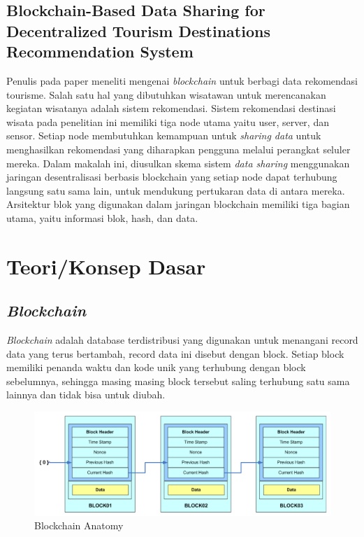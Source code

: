 \subsection{Blockchain-Based Data Sharing for Decentralized Tourism Destinations Recommendation System}
Penulis pada paper \parencite{hariadi2020} meneliti mengenai \emph{blockchain} untuk berbagi data rekomendasi tourisme.
Salah satu hal yang dibutuhkan wisatawan untuk merencanakan kegiatan wisatanya adalah sistem rekomendasi.
Sistem rekomendasi destinasi wisata pada penelitian ini memiliki tiga node utama yaitu user, server, dan sensor.
Setiap node membutuhkan kemampuan untuk \emph{sharing data} untuk menghasilkan rekomendasi yang diharapkan pengguna melalui perangkat seluler mereka.
Dalam makalah ini, diusulkan skema sistem \emph{data sharing} menggunakan jaringan desentralisasi berbasis blockchain yang setiap node dapat terhubung langsung satu sama lain, untuk mendukung pertukaran data di antara mereka. Arsitektur blok yang digunakan dalam jaringan blockchain memiliki tiga bagian utama, yaitu informasi blok, hash, dan data.

\section{Teori/Konsep Dasar}

\subsection{\emph{Blockchain}}

\emph{Blockchain} adalah database terdistribusi yang digunakan
untuk menangani record data yang terus bertambah, record data ini
disebut dengan block. Setiap block memiliki penanda waktu dan
kode unik yang terhubung dengan block sebelumnya, sehingga masing
masing block tersebut saling terhubung satu sama lainnya dan
tidak bisa untuk diubah.

\begin{figure} [ht] \centering
    \includegraphics[scale=0.4]{gambar/blockchainanatomy.png}
    \caption{Blockchain Anatomy}
    \label{fig:blockchainanatomy}
\end{figure}

